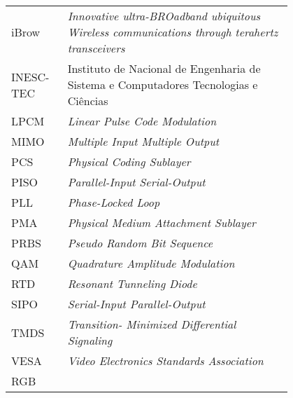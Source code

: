 \begin{flushleft}
\begin{tabular}{l p{0.8\linewidth}}
iBrow 		&	\textit{Innovative ultra-BROadband ubiquitous Wireless communications through terahertz transceivers}	\\
INESC-TEC	&	Instituto de Nacional de Engenharia de Sistema e Computadores Tecnologias e Ciências					\\
LPCM 		&	\textit{Linear Pulse Code Modulation}																	\\
MIMO		&	\textit{Multiple Input Multiple Output}																	\\
PCS			&	\textit{Physical Coding Sublayer}																		\\	
PISO		&	\textit{Parallel-Input Serial-Output}																	\\
PLL			&	\textit{Phase-Locked Loop}																				\\
PMA			&	\textit{Physical Medium Attachment Sublayer}															\\
PRBS		&	\textit{Pseudo Random Bit Sequence}																		\\
QAM			&	\textit{Quadrature Amplitude Modulation}																\\
RTD			&	\textit{Resonant Tunneling Diode}																		\\
SIPO		&	\textit{Serial-Input Parallel-Output}																	\\
TMDS		&	\textit{Transition- Minimized Differential Signaling}													\\
VESA		&	\textit{Video Electronics Standards Association}														\\
RGB			&	
\end{tabular}
\end{flushleft}

